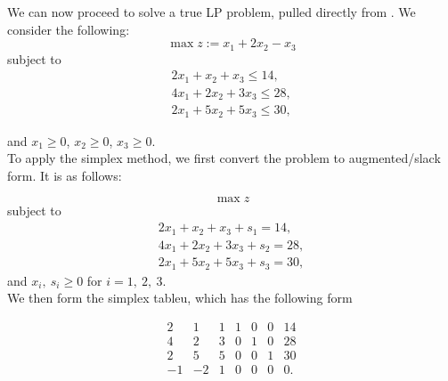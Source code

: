 \documentclass[12pt,english]{article}
\begin{document}
We can now proceed to solve a true LP problem, pulled directly from \cite{UWW}.  We consider the following:
$$
\max z := x_1 +2 x_2 - x_3
$$
subject to
$$
\begin{array}{c}
2 x_1 + x_2 + x_3 \leq 14, \\
4 x_1 + 2 x_2 + 3 x_3 \leq 28, \\
2 x_1 + 5 x_2 + 5 x_3 \leq 30,
\end{array}
$$

and $x_1 \geq 0$, $x_2 \geq 0$, $x_3 \geq 0$. \\

To apply the simplex method, we first convert the problem to augmented/slack form.  It is as follows:

$$
\max z
$$
subject to 
$$
\begin{array}{c}
2 x_1 + x_2 + x_3 + s_1 = 14, \\
4 x_1 + 2 x_2 + 3 x_3 + s_2 = 28, \\
2 x_1 + 5 x_2 + 5 x_3 + s_3 = 30,
\end{array}
$$
and $x_i, ~ s_i \geq 0$ for $i=1, ~2, ~3.$ \\

We then form the simplex tableu, which has the following form

\begin{equation}\label{eq:1.3}
\begin{array}{cccccc|c}
2 	&	1	& 	1 	& 	1	& 	0	&	0	&	14 \\
4	&	2	& 	3	&	0	&	1	&	0	&	28 \\
2	&	5	&	5	&	0	&	0	& 	1	& 	30 \\
\hline
-1	& 	-2	&	1	& 	0	&	0	&	0	&	0.
\end{array}
\end{equation}
\end{document}

